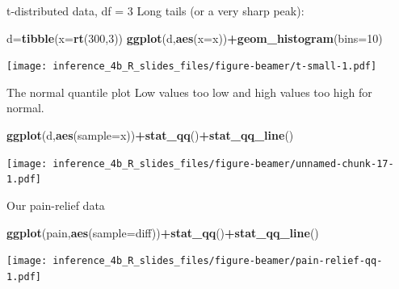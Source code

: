 \documentclass[
  ignorenonframetext,
]{beamer}
\newenvironment{Shaded}{\begin{snugshade}}{\end{snugshade}}
\newcommand{\DataTypeTok}[1]{\textcolor[rgb]{0.13,0.29,0.53}{#1}}
\newcommand{\DecValTok}[1]{\textcolor[rgb]{0.00,0.00,0.81}{#1}}
\newcommand{\KeywordTok}[1]{\textcolor[rgb]{0.13,0.29,0.53}{\textbf{#1}}}
\newcommand{\NormalTok}[1]{#1}
\newcommand{\OperatorTok}[1]{\textcolor[rgb]{0.81,0.36,0.00}{\textbf{#1}}}
\begin{document}
\begin{frame}[fragile]{t-distributed data, df = 3}
\protect\hypertarget{t-distributed-data-df-3}{}
Long tails (or a very sharp peak):

\begin{Shaded}
\begin{Highlighting}[]
\NormalTok{d=}\KeywordTok{tibble}\NormalTok{(}\DataTypeTok{x=}\KeywordTok{rt}\NormalTok{(}\DecValTok{300}\NormalTok{,}\DecValTok{3}\NormalTok{))}
\KeywordTok{ggplot}\NormalTok{(d,}\KeywordTok{aes}\NormalTok{(}\DataTypeTok{x=}\NormalTok{x))}\OperatorTok{+}\KeywordTok{geom\_histogram}\NormalTok{(}\DataTypeTok{bins=}\DecValTok{10}\NormalTok{)}
\end{Highlighting}
\end{Shaded}

\texttt{[image: inference\_4b\_R\_slides\_files/figure-beamer/t-small-1.pdf]}
\end{frame}

\begin{frame}[fragile]{The normal quantile plot}
\protect\hypertarget{the-normal-quantile-plot-5}{}
Low values too low and high values too high for normal.

\begin{Shaded}
\begin{Highlighting}[]
\KeywordTok{ggplot}\NormalTok{(d,}\KeywordTok{aes}\NormalTok{(}\DataTypeTok{sample=}\NormalTok{x))}\OperatorTok{+}\KeywordTok{stat\_qq}\NormalTok{()}\OperatorTok{+}\KeywordTok{stat\_qq\_line}\NormalTok{()}
\end{Highlighting}
\end{Shaded}

\texttt{[image: inference\_4b\_R\_slides\_files/figure-beamer/unnamed-chunk-17-1.pdf]}
\end{frame}

\begin{frame}[fragile]{Our pain-relief data}
\protect\hypertarget{our-pain-relief-data}{}
\begin{Shaded}
\begin{Highlighting}[]
\KeywordTok{ggplot}\NormalTok{(pain,}\KeywordTok{aes}\NormalTok{(}\DataTypeTok{sample=}\NormalTok{diff))}\OperatorTok{+}\KeywordTok{stat\_qq}\NormalTok{()}\OperatorTok{+}\KeywordTok{stat\_qq\_line}\NormalTok{()}
\end{Highlighting}
\end{Shaded}

\texttt{[image: inference\_4b\_R\_slides\_files/figure-beamer/pain-relief-qq-1.pdf]}
\end{frame}
\end{document}

